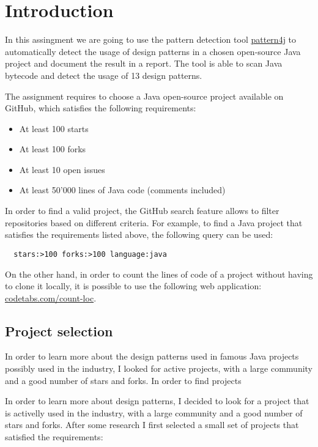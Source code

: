 \section{Introduction}

In this assingment we are going to use the pattern detection tool \href{https://users.encs.concordia.ca/~nikolaos/pattern\_detection.html}{pattern4j} to automatically detect the usage of design patterns in a chosen open-source Java project and document the result in a report. The tool is able to scan Java bytecode and detect the usage of 13 design patterns.

The assignment requires to choose a Java open-source project available on GitHub, which satisfies the following requirements:

\begin{itemize}
	\item At least 100 starts
	\item At least 100 forks
	\item At least 10 open issues
	\item At least 50'000 lines of Java code (comments included)
\end{itemize}

\noindent In order to find a valid project, the GitHub search feature allows to filter repositories based on different criteria. For example, to find a Java project that satisfies the requirements listed above, the following query can be used:

\begin{verbatim}
  stars:>100 forks:>100 language:java
\end{verbatim}

\noindent On the other hand, in order to count the lines of code of a project without having to clone it locally, it is possible to use the following web application: \href{https://codetabs.com/count-loc/count-loc-online.html}{codetabs.com/count-loc}.

\subsection{Project selection}

In order to learn more about the design patterns used in famous Java projects possibly used in the industry, I looked for active projects, with a large community and a good number of stars and forks. In order to find projects

In order to learn more about design patterns, I decided to look for a project that is activelly used in the industry, with a large community and a good number of stars and forks. After some research I first selected a small set of projects that satisfied the requirements:

